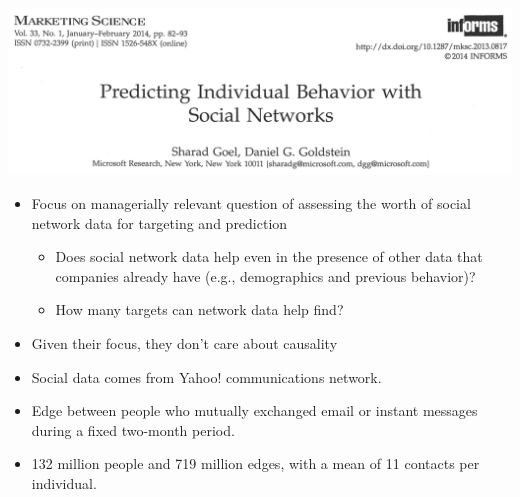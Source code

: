 \documentclass[aspectratio=169]{beamer}
\begin{document}
\begin{frame}

\begin{center}
\includegraphics[width=\textwidth]{figures/goel_predicting_2014_title}
\end{center}

\begin{itemize}
\item Focus on managerially relevant question of assessing the worth of social network data for targeting and prediction \pause
\begin{itemize}
\item Does social network data help even in the presence of other data that companies already have (e.g., demographics and previous behavior)?
\item How many targets can network data help find? \pause
\end{itemize}
\item Given their focus, they don't care about causality
\end{itemize}

\end{frame}
\begin{frame}

\begin{itemize}
\item Social data comes from Yahoo! communications network.
\item Edge between people who mutually exchanged email or instant messages during a fixed two-month period. 
\item 132 million people and 719 million edges, with a mean of 11 contacts per individual.
\end{itemize}

\end{frame}
\end{document}
